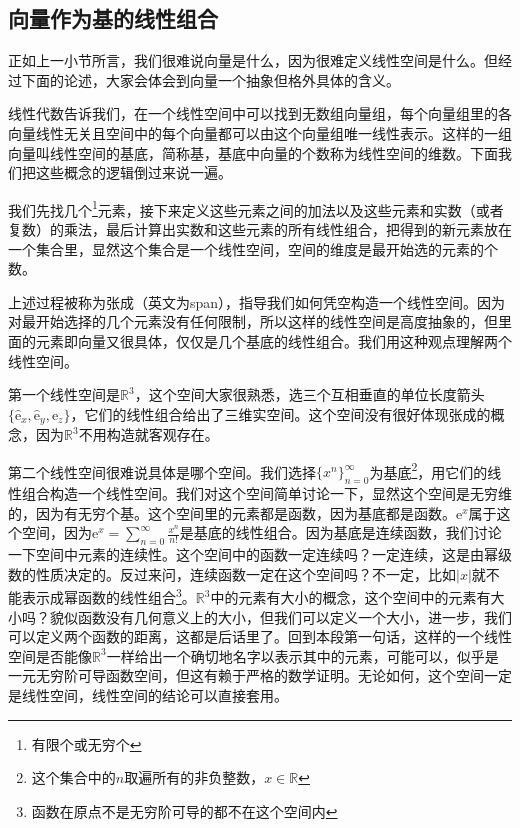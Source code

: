 \documentclass[../../main.tex]{subfiles}
\begin{document}
\subsection{向量作为基的线性组合}
正如上一小节所言，我们很难说向量是什么，因为很难定义线性空间是什么。但经过下面的论述，大家会体会到向量一个抽象但格外具体的含义。

线性代数告诉我们，在一个线性空间中可以找到无数组向量组，每个向量组里的各向量线性无关且空间中的每个向量都可以由这个向量组唯一线性表示。这样的一组向量叫线性空间的基底，简称基，基底中向量的个数称为线性空间的维数。下面我们把这些概念的逻辑倒过来说一遍。

我们先找几个\footnote{有限个或无穷个}元素，接下来定义这些元素之间的加法以及这些元素和实数（或者复数）的乘法，最后计算出实数和这些元素的所有线性组合，把得到的新元素放在一个集合里，显然这个集合是一个线性空间，空间的维度是最开始选的元素的个数。

上述过程被称为张成（英文为span），指导我们如何凭空构造一个线性空间。因为对最开始选择的几个元素没有任何限制，所以这样的线性空间是高度抽象的，但里面的元素即向量又很具体，仅仅是几个基底的线性组合。我们用这种观点理解两个线性空间。

第一个线性空间是\(\mathbb{R}^3\)，这个空间大家很熟悉，选三个互相垂直的单位长度箭头\(\{\hat{\mathbf{\mathrm{e}}}_x,\hat{\mathbf{\mathrm{e}}}_y,\hat{\mathbf{\mathrm{e}}}_z\}\)，它们的线性组合给出了三维实空间。这个空间没有很好体现张成的概念，因为\(\mathbb{R}^3\)不用构造就客观存在。

第二个线性空间很难说具体是哪个空间。我们选择\(\{x^n\}_{n=0}^{\infty}\)为基底\footnote{这个集合中的\(n\)取遍所有的非负整数，\(x\in \mathbb{R}\)}，用它们的线性组合构造一个线性空间。我们对这个空间简单讨论一下，显然这个空间是无穷维的，因为有无穷个基。这个空间里的元素都是函数，因为基底都是函数。\(\mathrm{e}^x\)属于这个空间，因为\(\displaystyle \mathrm{e}^x=\sum_{n=0}^{\infty}\frac{x^n}{n!}\)是基底的线性组合。因为基底是连续函数，我们讨论一下空间中元素的连续性。这个空间中的函数一定连续吗？一定连续，这是由幂级数的性质决定的。反过来问，连续函数一定在这个空间吗？不一定，比如\(|x|\)就不能表示成幂函数的线性组合\footnote{函数在原点不是无穷阶可导的都不在这个空间内}。\(\mathbb{R}^3\)中的元素有大小的概念，这个空间中的元素有大小吗？貌似函数没有几何意义上的大小，但我们可以定义一个大小，进一步，我们可以定义两个函数的距离，这都是后话里了。回到本段第一句话，这样的一个线性空间是否能像\(\mathbb{R}^3\)一样给出一个确切地名字以表示其中的元素，可能可以，似乎是一元无穷阶可导函数空间，但这有赖于严格的数学证明。无论如何，这个空间一定是线性空间，线性空间的结论可以直接套用。
\end{document}
